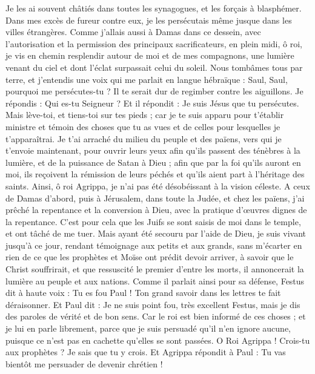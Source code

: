 \begin{multicols}{2}
Je les ai souvent châtiés dans toutes les synagogues, et les forçais à blasphémer. Dans mes excès de fureur contre eux, je les persécutais même jusque dans les villes étrangères.
Comme j'allais aussi à Damas dans ce dessein, avec l’autorisation et la permission des principaux sacrificateurs,
en plein midi, ô roi, je vis en chemin resplendir autour de moi et de mes compagnons, une lumière venant du ciel et dont l’éclat surpassait celui du soleil.
Nous tombâmes tous par terre, et j’entendis une voix qui me parlait en langue hébraïque : Saul, Saul, pourquoi me persécutes-tu ? Il te serait dur de regimber contre les aiguillons.
Je répondis : Qui es-tu Seigneur ? Et il répondit : Je suis Jésus que tu persécutes.
Mais lève-toi, et tiens-toi sur tes pieds ; car je te suis apparu pour t'établir ministre et témoin des choses que tu as vues et de celles pour lesquelles je t'apparaîtrai.
Je t’ai arraché du milieu du peuple et des païens, vers qui je t'envoie maintenant,
pour ouvrir leurs yeux afin qu'ils passent des ténèbres à la lumière, et de la puissance de Satan à Dieu ; afin que par la foi qu’ils auront en moi, ils reçoivent la rémission de leurs péchés et qu’ils aient part à l’héritage des saints.
Ainsi, ô roi Agrippa, je n’ai pas été désobéissant à la vision céleste.
A ceux de Damas d’abord, puis à Jérusalem, dans toute la Judée, et chez les païens, j’ai prêché la repentance et la conversion à Dieu, avec la pratique d’œuvres dignes de la repentance.
C'est pour cela que les Juifs se sont saisis de moi dans le temple, et ont tâché de me tuer.
Mais ayant été secouru par l'aide de Dieu, je suis vivant jusqu'à ce jour, rendant témoignage aux petits et aux grands, sans m’écarter en rien de ce que les prophètes et Moïse ont prédit devoir arriver,
à savoir que le Christ souffrirait, et que ressuscité le premier d’entre les morts, il annoncerait la lumière au peuple et aux nations.
Comme il parlait ainsi pour sa défense, Festus dit à haute voix : Tu es fou Paul ! Ton grand savoir dans les lettres te fait déraisonner.
Et Paul dit : Je ne suis point fou, très excellent Festus, mais je dis des paroles de vérité et de bon sens.
Car le roi est bien informé de ces choses ; et je lui en parle librement, parce que je suis persuadé qu'il n’en ignore aucune, puisque ce n’est pas en cachette qu’elles se sont passées.
O Roi Agrippa ! Crois-tu aux prophètes ? Je sais que tu y crois.
Et Agrippa répondit à Paul : Tu vas bientôt me persuader de devenir chrétien !

\end{multicols}
